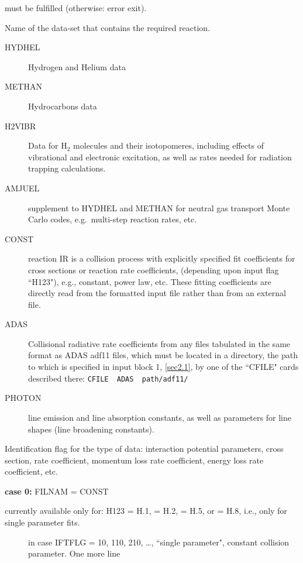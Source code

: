 \begin{description}
        must be fulfilled (otherwise: error exit).
  \item[FILNAM] Name of the data-set that contains the required reaction.
        \begin{description}
          \item[HYDHEL] Hydrogen and Helium data \cite{kn:Janev}
          \item[METHAN]
                Hydrocarbons data \cite{kn:Ehrhardt}
          \item[H2VIBR] Data for H$_2$ molecules and
                their isotopomeres, including effects of vibrational and electronic excitation,
                as well as rates needed for radiation trapping calculations.
          \item[AMJUEL] supplement to HYDHEL and METHAN for neutral gas transport Monte
                Carlo codes, e.g.\ multi-step reaction rates, etc.
          \item[CONST] reaction IR is
                a collision process with explicitly specified fit coefficients for cross
                sections or reaction rate coefficients, (depending upon input flag ``H123"),
                e.g., constant, power law, etc. These fitting coefficients are directly read
                from the formatted input file rather than from an external file.
          \item[ADAS] Collisional radiative rate coefficients from any files tabulated in
                the same format as \ac{ADAS} adf11 files, which must be located in a directory,
                the path to which is specified in input block 1, \cref{sec2.1}, by one of the
                ``CFILE" cards described there:   \lstinline|CFILE  ADAS  path/adf11/|
          \item[PHOTON]  line
                emission and line absorption constants, as well as parameters for line shapes
                (line broadening constants).

        \end{description}
  \item[H123] Identification flag for the type of data: interaction potential
        parameters, cross section, rate coefficient, momentum loss rate coefficient,
        energy loss rate coefficient, etc. 

        \textbf{case 0:} FILNAM = CONST 

        currently available only for: H123 = H.1, = H.2, = H.5, or = H.8, i.e., only
        for single parameter fits.
        \begin{description}
          \item[] in case IFTFLG = 10, 110, 210, \dots, ``single parameter", constant
                collision parameter.
                One more line 


\end{description}
\end{description}
